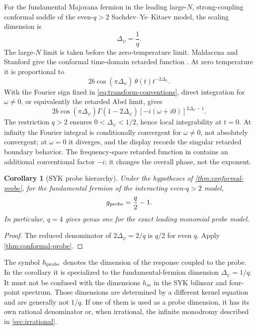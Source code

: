 \documentclass[11pt,reqno]{amsart}
\newtheorem{corollary}[theorem]{Corollary}
\theoremstyle{remark}
\begin{document}
For the fundamental Majorana fermion in the leading large-$N$,
strong-coupling conformal saddle of the even-$q>2$ Sachdev--Ye--Kitaev model,
the scaling dimension is
\begin{equation}\label{eq:syk-delta}
 \Delta_\psi=\frac1q.
\end{equation}
The large-$N$ limit is taken before the zero-temperature limit.  Maldacena
and Stanford give the conformal time-domain retarded function
\cite{MaldacenaStanford2016}.  At zero temperature it is proportional to
\begin{equation}\label{eq:syk-zero-temperature-time}
 2b\cos(\pi\Delta_\psi)\,
 \theta(t)t^{-2\Delta_\psi}.
\end{equation}
With the Fourier sign fixed in \eqref{eq:transform-conventions}, direct
integration for $\omega\ne0$, or equivalently the retarded Abel limit, gives
\begin{equation}\label{eq:syk-zero-temperature-frequency}
 2b\cos(\pi\Delta_\psi)\Gamma(1-2\Delta_\psi)
 [-i(\omega+i0)]^{2\Delta_\psi-1}.
\end{equation}
The restriction $q>2$ ensures $0<\Delta_\psi<1/2$, hence local integrability
at $t=0$.  At infinity the Fourier integral is conditionally convergent for
$\omega\ne0$, not absolutely convergent; at $\omega=0$ it diverges, and the
display records the singular retarded boundary behavior.  The frequency-space
retarded function in \cite{MaldacenaStanford2016} contains an additional
conventional factor $-i$; it changes the overall phase, not the exponent.

\begin{corollary}[SYK probe hierarchy]\label{cor:syk-genus}
Under the hypotheses of \cref{thm:conformal-probe}, for the fundamental
fermion of the interacting even-$q>2$ model,
\begin{equation}\label{eq:syk-genus}
 g_{\rm probe}=\frac{q}{2}-1.
\end{equation}
In particular, $q=4$ gives genus one for the exact leading monomial probe
model.
\end{corollary}

\begin{proof}
The reduced denominator of $2\Delta_\psi=2/q$ is $q/2$ for even $q$.  Apply
\cref{thm:conformal-probe}.
\end{proof}

The symbol $h_{\rm probe}$ denotes the dimension of the response coupled to
the probe.  In the corollary it is specialized to the fundamental-fermion
dimension $\Delta_\psi=1/q$.  It must not be confused with the dimensions
$h_m$ in the SYK bilinear and four-point spectrum.  Those dimensions are
determined by a different kernel equation and are generally not $1/q$.  If
one of them is used as a probe dimension, it has its own rational denominator
or, when irrational, the infinite monodromy described in
\cref{sec:irrational}.
\end{document}
